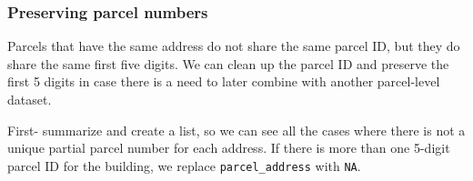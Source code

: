 \documentclass[]{article}
\newenvironment{Shaded}{\begin{snugshade}}{\end{snugshade}}
\newcommand{\KeywordTok}[1]{\textcolor[rgb]{0.13,0.29,0.53}{\textbf{#1}}}
\newcommand{\DataTypeTok}[1]{\textcolor[rgb]{0.13,0.29,0.53}{#1}}
\newcommand{\DecValTok}[1]{\textcolor[rgb]{0.00,0.00,0.81}{#1}}
\newcommand{\StringTok}[1]{\textcolor[rgb]{0.31,0.60,0.02}{#1}}
\newcommand{\OtherTok}[1]{\textcolor[rgb]{0.56,0.35,0.01}{#1}}
\newcommand{\ControlFlowTok}[1]{\textcolor[rgb]{0.13,0.29,0.53}{\textbf{#1}}}
\newcommand{\OperatorTok}[1]{\textcolor[rgb]{0.81,0.36,0.00}{\textbf{#1}}}
\newcommand{\NormalTok}[1]{#1}
\begin{document}
\subsubsection{Preserving parcel
numbers}\label{preserving-parcel-numbers}

Parcels that have the same address do not share the same parcel ID, but
they do share the same first five digits. We can clean up the parcel ID
and preserve the first 5 digits in case there is a need to later combine
with another parcel-level dataset.

First- summarize and create a list, so we can see all the cases where
there is not a unique partial parcel number for each address. If there
is more than one 5-digit parcel ID for the building, we replace
\texttt{parcel\_address} with \texttt{NA}.

\begin{Shaded}
\end{Shaded}
\end{document}
